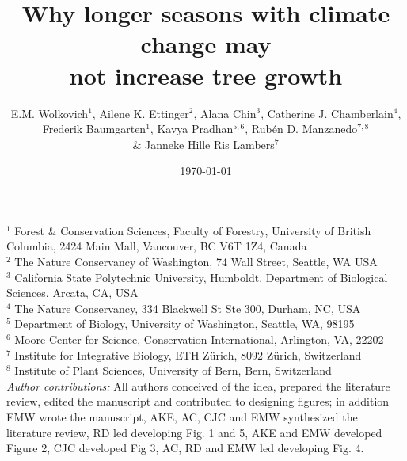 \documentclass[11pt]{article}
\begin{document}
\renewcommand{\refname}{\CHead{}}


\title{Why longer seasons with climate change may \\ not increase tree growth} 
\author{E.M. Wolkovich$^1$, Ailene K. Ettinger$^2$, Alana Chin$^3$, Catherine J. Chamberlain$^4$,\\ Frederik Baumgarten$^1$, Kavya Pradhan$^{5,6}$, Rub{\'e}n D. Manzanedo$^{7,8}$ \\ \& Janneke Hille Ris Lambers$^7$}
\date{\today}
\maketitle

$^1$ Forest \& Conservation Sciences, Faculty of Forestry, University of British Columbia, 2424 Main Mall, Vancouver, BC V6T 1Z4, Canada\\
$^2$ The Nature Conservancy of Washington, 74 Wall Street, Seattle, WA  USA \\
$^3$ California State Polytechnic University, Humboldt. Department of Biological Sciences. Arcata, CA, USA \\
$^4$ The Nature Conservancy, 334 Blackwell St Ste 300, Durham, NC, USA \\ 
$^5$ Department of Biology, University of Washington, Seattle, WA, 98195 \\
$^6$ Moore Center for Science, Conservation International, Arlington, VA, 22202 \\ %
$^7$ Institute for Integrative Biology, ETH Z{\"u}rich, 8092 Z{\"u}rich, Switzerland \\ %
$^8$ Institute of Plant Sciences, University of Bern, Bern, Switzerland \\

\emph{Author contributions:}  All authors conceived of the idea, prepared the literature review, edited the manuscript and contributed to designing figures; in addition EMW wrote the manuscript, AKE, AC, CJC  and EMW synthesized the literature review, RD led developing Fig. 1 and 5, AKE and EMW developed Figure 2, CJC developed Fig 3, AC, RD and EMW led developing Fig. 4. 
\end{document}
